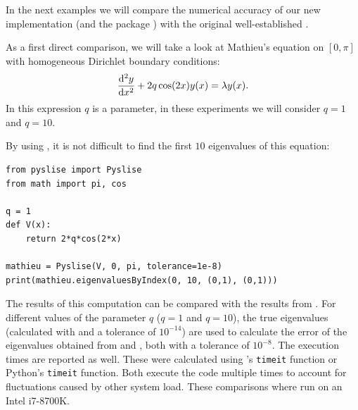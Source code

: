 In the next examples we will compare the numerical accuracy of our new implementation  (and the \lpython{} package \pyslise{}) with the original well-established .

As a first direct comparison, we will take a look at Mathieu's equation \cite{pryce_sltstpak_1999} on $[0, \pi]$ with homogeneous Dirichlet boundary conditions: \begin{equation}
    \dv[2]{y}{x} + 2q\cos(2x)y(x) = \lambda y(x) \text{.}\label{equ:c2_mathieu_equation}
\end{equation}
In this expression $q$ is a parameter, in these experiments we will consider $q=1$ and $q=10$.

By using \pyslise{}, it is not difficult to find the first $10$ eigenvalues of this equation:

\begin{verbatim}
from pyslise import Pyslise
from math import pi, cos

q = 1
def V(x):
    return 2*q*cos(2*x)

mathieu = Pyslise(V, 0, pi, tolerance=1e-8)
print(mathieu.eigenvaluesByIndex(0, 10, (0,1), (0,1)))
\end{verbatim}

The results of this computation can be compared with the results from . For different values of the parameter $q$ ($q = 1$ and $q = 10$), the true eigenvalues (calculated with  and a tolerance of $10^{-14}$) are used to calculate the error of the eigenvalues obtained from  and \pyslise{}, both with a tolerance of $10^{-8}$. The execution times are reported as well. These were calculated using \matlab{}'s \texttt{timeit} function or Python's \texttt{timeit} function. Both execute the code multiple times to account for fluctuations caused by other system load. These comparisons where run on an Intel i7-8700K.

